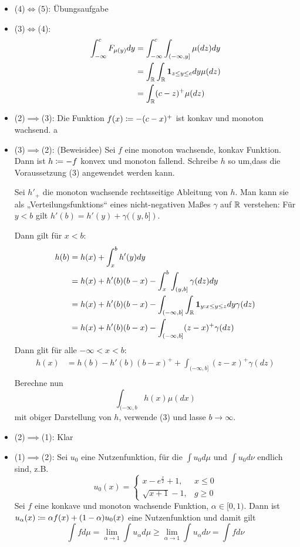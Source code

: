 \documentclass[a4paper,twoside,DIV15,BCOR12mm]{scrbook}
\begin{document}
\begin{beweis}
\begin{itemize}
\item (4)$\iff$(5): Übungsaufgabe
\item (3)$\iff$(4):
\begin{align*}
\int_{-\infty}^c F_{\mu(y)}dy &= \int_{-\infty}^c \int_{(-\infty,y]} \mu(dz)dy \\
&=\int_{\mathbb{R}} \int_{\mathbb{R}} \mathbf 1_{z\le y\le c}dy \mu(dz) \\
&=\int_{\mathbb{R}} (c-z)^+ \mu(dz)
\end{align*}
\item (2)$\implies$(3): Die Funktion $f(x) \da -(c-x)^+$ ist konkav und monoton wachsend.
a\item (3)$\implies$(2): (Beweisidee) Sei $f$ eine monoton wachsende, konkav Funktion. Dann ist $h\da -f$ konvex und monoton fallend. Schreibe $h$ so um,dass die Voraussetzung (3) angewendet werden kann.

Sei $h'_+$ die monoton wachsende rechtsseitige Ableitung von $h$. Man kann sie als „Verteilungsfunktions“ eines nicht-negativen Maßes $\gamma$ auf $\mathbb{R}$ verstehen: Für $y<b$ gilt $h'(b) = h'(y) + \gamma( (y,b])$.

Dann gilt für $x<b$:
\begin{align*}
h(b) &= h(x) + \int_x^b h'(y) dy \\
&=h(x) + h'(b)(b-x) -\int_x^b \int_{(y,b]} \gamma(dz)dy \\
&=h(x) + h'(b)(b-x) - \int_{(-\infty,b]}\int_{\mathbb{R}} \mathbf 1_{y:x\le y \le z} dy \gamma(dz) \\
&=h(x) + h'(b)(b-x) - \int_{(-\infty,b]} (z-x)^+ \gamma(dz) 
\end{align*}
Dann glit für alle $-\infty<x<b$:
\begin{align*}
h(x) &= h(b) - h'(b)(b-x)^+ + \int_{(-\infty,b]} (z-x)^+ \gamma(dz) \\
\end{align*}
Berechne nun
\[
\int_{(-\infty,b} h(x) \mu(dx)
\]
 mit obiger Darstellung von $h$, verwende (3) und lasse $b\to\infty$.
\item (2)$\implies$(1): Klar
\item (1)$\implies$(2): Sei $u_0$ eine Nutzenfunktion, für die $\int u_0d\mu$ und $\int u_0d\nu$ endlich sind, z.B.
\[
u_0(x) = 
\begin{cases}
x - e^{\frac x2} + 1, & x\le 0\\
\sqrt{x + 1} -1, &g\ge 0
\end{cases}
\]
Sei $f$ eine konkave und monoton wachsende Funktion, $\alpha \in [0, 1)$. Dann ist $u_\alpha(x) \da \alpha f(x) + (1-\alpha)u_0(x)$ eine Nutzenfunktion und damit gilt 
\[
\int f d\mu = \lim_{\alpha\to 1} \int u_\alpha d\mu \ge \lim_{\alpha \to 1} \int u_{\alpha}d\nu = \int f d\nu
\]
\end{itemize}
\end{beweis}
\end{document}
